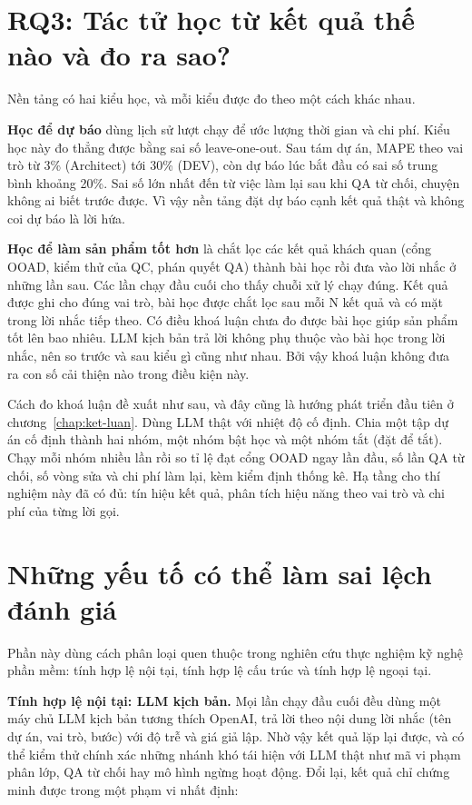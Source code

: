 \section{RQ3: Tác tử học từ kết quả thế nào và đo ra sao?}

Nền tảng có hai kiểu học, và mỗi kiểu được đo theo một cách khác nhau.

\textbf{Học để dự báo} dùng lịch sử lượt chạy để ước lượng thời gian và chi phí. Kiểu học này đo thẳng được bằng sai số leave-one-out. Sau tám dự án, MAPE theo vai trò từ 3\% (Architect) tới 30\% (DEV), còn dự báo lúc bắt đầu có sai số trung bình khoảng 20\%. Sai số lớn nhất đến từ việc làm lại sau khi QA từ chối, chuyện không ai biết trước được. Vì vậy nền tảng đặt dự báo cạnh kết quả thật và không coi dự báo là lời hứa.

\textbf{Học để làm sản phẩm tốt hơn} là chắt lọc các kết quả khách quan (cổng OOAD, kiểm thử của QC, phán quyết QA) thành bài học rồi đưa vào lời nhắc ở những lần sau. Các lần chạy đầu cuối cho thấy chuỗi xử lý chạy đúng. Kết quả được ghi cho đúng vai trò, bài học được chắt lọc sau mỗi N kết quả và có mặt trong lời nhắc tiếp theo. Có điều khoá luận chưa đo được bài học giúp sản phẩm tốt lên bao nhiêu. LLM kịch bản trả lời không phụ thuộc vào bài học trong lời nhắc, nên so trước và sau kiểu gì cũng như nhau. Bởi vậy khoá luận không đưa ra con số cải thiện nào trong điều kiện này.

Cách đo khoá luận đề xuất như sau, và đây cũng là hướng phát triển đầu tiên ở chương~\ref{chap:ket-luan}. Dùng LLM thật với nhiệt độ cố định. Chia một tập dự án cố định thành hai nhóm, một nhóm bật học và một nhóm tắt (đặt  để tắt). Chạy mỗi nhóm nhiều lần rồi so tỉ lệ đạt cổng OOAD ngay lần đầu, số lần QA từ chối, số vòng sửa và chi phí làm lại, kèm kiểm định thống kê. Hạ tầng cho thí nghiệm này đã có đủ: tín hiệu kết quả, phân tích hiệu năng theo vai trò và chi phí của từng lời gọi.

\section{Những yếu tố có thể làm sai lệch đánh giá}
\label{sec:hop-le}

Phần này dùng cách phân loại quen thuộc trong nghiên cứu thực nghiệm kỹ nghệ phần mềm: tính hợp lệ nội tại, tính hợp lệ cấu trúc và tính hợp lệ ngoại tại.

\textbf{Tính hợp lệ nội tại: LLM kịch bản.} Mọi lần chạy đầu cuối đều dùng một máy chủ LLM kịch bản tương thích OpenAI, trả lời theo nội dung lời nhắc (tên dự án, vai trò, bước) với độ trễ và giá giả lập. Nhờ vậy kết quả lặp lại được, và có thể kiểm thử chính xác những nhánh khó tái hiện với LLM thật như mã vi phạm phân lớp, QA từ chối hay mô hình ngừng hoạt động. Đổi lại, kết quả chỉ chứng minh được trong một phạm vi nhất định:

